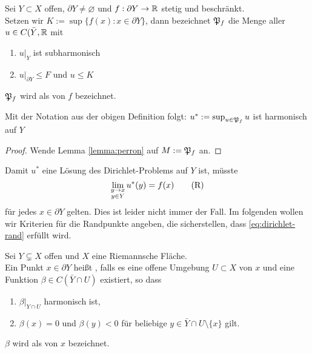 \begin{defin}
  Sei $Y \subset X$ offen, $\partial Y \neq \varnothing$ und
  $f: \partial Y \rightarrow \mathbb{R}$ stetig und beschränkt. \\
  Setzen wir $K := \sup\{f(x) : x \in \partial Y\}$, dann bezeichnet
  $\mathfrak{P}_f$ die Menge aller $u \in C(\bar Y, \mathbb{R}$ mit
  \begin{enumerate}
  \item $u|_Y$ ist subharmonisch
  \item $u|_{\partial Y} \leq F$ und $u \leq K$
  \end{enumerate}
  $\mathfrak{P}_f$ wird als  von $f$ bezeichnet.
\end{defin}

\begin{cor}
  Mit der Notation aus der obigen Definition folgt: $u^\ast := \sup_{u
    \in \mathfrak{P}_f} u$ ist harmonisch auf $Y$
\end{cor}

\begin{proof}
  Wende Lemma \ref{lemma:perron} auf $M := \mathfrak{P}_f$ an.
\end{proof}

\begin{rem}
  Damit $u^\ast$ eine Lösung des Dirichlet-Problems auf $Y$ ist,
  müsste
  \[
  \lim_{\substack{y\rightarrow x\\y \in Y}}u^\ast(y) =
  f(x) \label{eq:dirichlet-rand} \tag{R}
  \]
  für jedes $x \in \partial Y$ gelten. Dies ist leider nicht immer der
  Fall. Im folgenden wollen wir Kriterien für die Randpunkte angeben,
  die sicherstellen, dass \eqref{eq:dirichlet-rand} erfüllt wird.
\end{rem}

\begin{defin}
  Sei $Y \subsetneq X$ offen und $X$ eine Riemannsche Fläche. \\
  Ein Punkt $x \in \partial Y$ heißt , falls es eine
  offene Umgebung $U \subset X$ von $x$ und eine Funktion $\beta  \in
  C(\bar Y \cap U)$ existiert, so dass
  \begin{enumerate}
  \item $\beta|_{Y \cap U}$ harmonisch ist,
  \item $\beta(x) =0$ und $\beta(y) < 0$ für beliebige $y \in \bar Y
    \cap U \setminus \{x\}$ gilt.
  \end{enumerate}
  $\beta$ wird als  von $x$ bezeichnet.
\end{defin}


